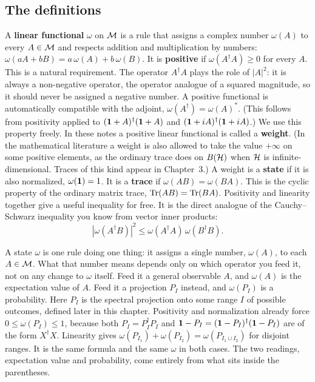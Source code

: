 \subsection*{The definitions}

A \textbf{linear functional} $\omega$ on $\mathcal{M}$ is a rule that assigns a complex number $\omega(A)$ to every
$A\in\mathcal{M}$ and respects addition and multiplication by numbers: $\omega(aA+bB)=a\,\omega(A)+b\,\omega(B)$. It is
\textbf{positive} if $\omega(A^\dagger A)\ge0$ for every $A$. This is a natural requirement. The operator
$A^\dagger A$ plays the role of $|A|^2$: it is always a non-negative operator, the operator analogue of a
squared magnitude, so it should never be assigned a negative number. A positive functional is automatically
compatible with the adjoint, $\omega(A^\dagger)=\omega(A)^*$. (This follows from positivity applied to
$(\mathbf{1}+A)^\dagger(\mathbf{1}+A)$ and $(\mathbf{1}+iA)^\dagger(\mathbf{1}+iA)$.) We use this property freely. In these notes a positive
linear functional is called a \textbf{weight}. (In the mathematical literature a weight is also allowed to
take the value $+\infty$ on some positive elements, as the ordinary trace does on $B(\mathcal{H})$ when $\mathcal{H}$ is
infinite-dimensional. Traces of this kind appear in Chapter~3.) A weight is a \textbf{state} if it is also
normalized, $\omega(\mathbf{1})=1$. It is a \textbf{trace} if $\omega(AB)=\omega(BA)$. This is the cyclic property of
the ordinary matrix trace, $\operatorname{Tr}(AB)=\operatorname{Tr}(BA)$. Positivity and linearity together give a useful inequality for
free. It is the direct analogue of the Cauchy--Schwarz inequality you know from vector inner products:
\begin{equation}
|\omega(A^\dagger B)|^2\le\omega(A^\dagger A)\,\omega(B^\dagger B) .
\label{eq:CS-omega}
\end{equation}

A state $\omega$ is one rule doing one thing: it assigns a single number, $\omega(A)$, to each $A\in\mathcal{M}$. What
that number means depends only on which operator you feed it, not on any change to $\omega$ itself. Feed it
a general observable $A$, and $\omega(A)$ is the expectation value of $A$. Feed it a projection $P_I$
instead, and $\omega(P_I)$ is a probability. Here $P_I$ is the spectral projection onto some range $I$ of
possible outcomes, defined later in this chapter. Positivity and normalization already force
$0\le\omega(P_I)\le1$, because both $P_I=P_I^\dagger P_I$ and $\mathbf{1}-P_I=(\mathbf{1}-P_I)^\dagger(\mathbf{1}-P_I)$ are of the
form $X^\dagger X$. Linearity gives $\omega(P_{I_1})+\omega(P_{I_2})=\omega(P_{I_1\cup I_2})$ for disjoint
ranges. It is the same formula and the same $\omega$ in both cases. The two readings, expectation value and
probability, come entirely from what sits inside the parentheses.

